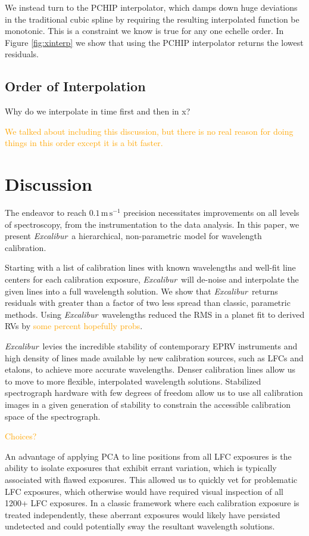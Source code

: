 \documentclass[12pt, onecolumn]{aastex63}
\newcommand{\lz}[1]{\textcolor{orange}{#1}}
\newcommand{\project}[1]{\textsl{#1}}
\newcommand{\name}{\project{Excalibur}}
\newcommand{\mps}{\mathrm{m\,s^{-1}}}
\begin{document}
We instead turn to the PCHIP interpolator, which damps down huge deviations in the traditional cubic spline by requiring the resulting interpolated function be monotonic.  This is a constraint we know is true for any one echelle order.  In Figure \ref{fig:xinterp} we show that using the PCHIP interpolator returns the lowest residuals.

\subsection{Order of Interpolation}
Why do we interpolate in time first and then in x?

\lz{We talked about including this discussion, but there is no real reason for doing things in this order except it is a bit faster.}


\section{Discussion} \label{sec:discussion}
The endeavor to reach $0.1\,\mps$ precision necessitates improvements on all levels of spectroscopy, from the instrumentation to the data analysis.  In this paper, we present \name\, a hierarchical, non-parametric model for wavelength calibration.  

Starting with a list of calibration lines with known wavelengths and well-fit line centers for each calibration exposure, \name\ will de-noise and interpolate the given lines into a full wavelength solution.  We show that \name\ returns residuals with greater than a factor of two less spread than classic, parametric methods.  Using \name\ wavelengths reduced the RMS in a planet fit to derived RVs by \lz{some percent hopefully probs}.

\name\ levies the incredible stability of contemporary EPRV instruments and high density of lines made available by new calibration sources, such as LFCs and etalons, to achieve more accurate wavelengths.  Denser calibration lines allow us to move to more flexible, interpolated wavelength solutions.  Stabilized spectrograph hardware with few degrees of freedom allow us to use all calibration images in a given generation of stability to constrain the accessible calibration space of the spectrograph.

\lz{Choices?}

An advantage of applying PCA to line positions from all LFC exposures is the ability to isolate exposures that exhibit errant variation, which is typically associated with flawed exposures.  This allowed us to quickly vet for problematic LFC exposures, which otherwise would have required visual inspection of all 1200+ LFC exposures.  In a classic framework where each calibration exposure is treated independently, these aberrant exposures would likely have persisted undetected and could potentially sway the resultant wavelength solutions.
\end{document}
